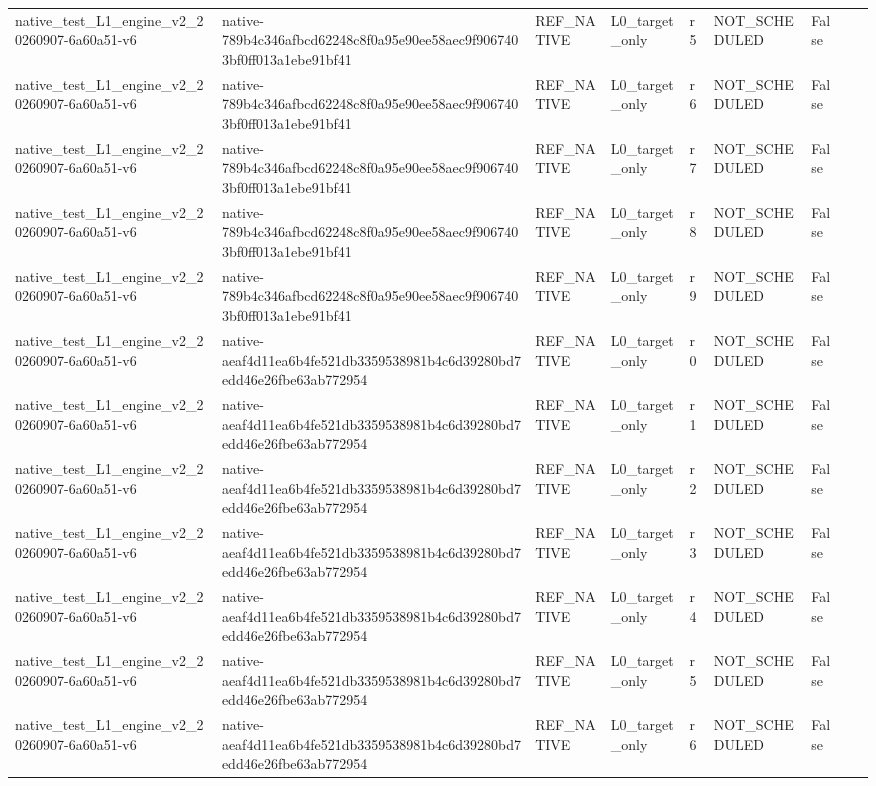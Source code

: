 \begin{tabular}{lllllllll}
native\_test\_L1\_engine\_v2\_20260907-6a60a51-v6 & native-789b4c346afbcd62248c8f0a95e90ee58aec9f9067403bf0ff013a1ebe91bf41 & REF\_NATIVE & L0\_target\_only & r5 & NOT\_SCHEDULED & False &  &  \\
native\_test\_L1\_engine\_v2\_20260907-6a60a51-v6 & native-789b4c346afbcd62248c8f0a95e90ee58aec9f9067403bf0ff013a1ebe91bf41 & REF\_NATIVE & L0\_target\_only & r6 & NOT\_SCHEDULED & False &  &  \\
native\_test\_L1\_engine\_v2\_20260907-6a60a51-v6 & native-789b4c346afbcd62248c8f0a95e90ee58aec9f9067403bf0ff013a1ebe91bf41 & REF\_NATIVE & L0\_target\_only & r7 & NOT\_SCHEDULED & False &  &  \\
native\_test\_L1\_engine\_v2\_20260907-6a60a51-v6 & native-789b4c346afbcd62248c8f0a95e90ee58aec9f9067403bf0ff013a1ebe91bf41 & REF\_NATIVE & L0\_target\_only & r8 & NOT\_SCHEDULED & False &  &  \\
native\_test\_L1\_engine\_v2\_20260907-6a60a51-v6 & native-789b4c346afbcd62248c8f0a95e90ee58aec9f9067403bf0ff013a1ebe91bf41 & REF\_NATIVE & L0\_target\_only & r9 & NOT\_SCHEDULED & False &  &  \\
native\_test\_L1\_engine\_v2\_20260907-6a60a51-v6 & native-aeaf4d11ea6b4fe521db3359538981b4c6d39280bd7edd46e26fbe63ab772954 & REF\_NATIVE & L0\_target\_only & r0 & NOT\_SCHEDULED & False &  &  \\
native\_test\_L1\_engine\_v2\_20260907-6a60a51-v6 & native-aeaf4d11ea6b4fe521db3359538981b4c6d39280bd7edd46e26fbe63ab772954 & REF\_NATIVE & L0\_target\_only & r1 & NOT\_SCHEDULED & False &  &  \\
native\_test\_L1\_engine\_v2\_20260907-6a60a51-v6 & native-aeaf4d11ea6b4fe521db3359538981b4c6d39280bd7edd46e26fbe63ab772954 & REF\_NATIVE & L0\_target\_only & r2 & NOT\_SCHEDULED & False &  &  \\
native\_test\_L1\_engine\_v2\_20260907-6a60a51-v6 & native-aeaf4d11ea6b4fe521db3359538981b4c6d39280bd7edd46e26fbe63ab772954 & REF\_NATIVE & L0\_target\_only & r3 & NOT\_SCHEDULED & False &  &  \\
native\_test\_L1\_engine\_v2\_20260907-6a60a51-v6 & native-aeaf4d11ea6b4fe521db3359538981b4c6d39280bd7edd46e26fbe63ab772954 & REF\_NATIVE & L0\_target\_only & r4 & NOT\_SCHEDULED & False &  &  \\
native\_test\_L1\_engine\_v2\_20260907-6a60a51-v6 & native-aeaf4d11ea6b4fe521db3359538981b4c6d39280bd7edd46e26fbe63ab772954 & REF\_NATIVE & L0\_target\_only & r5 & NOT\_SCHEDULED & False &  &  \\
native\_test\_L1\_engine\_v2\_20260907-6a60a51-v6 & native-aeaf4d11ea6b4fe521db3359538981b4c6d39280bd7edd46e26fbe63ab772954 & REF\_NATIVE & L0\_target\_only & r6 & NOT\_SCHEDULED & False &  &  \\

\end{tabular}

